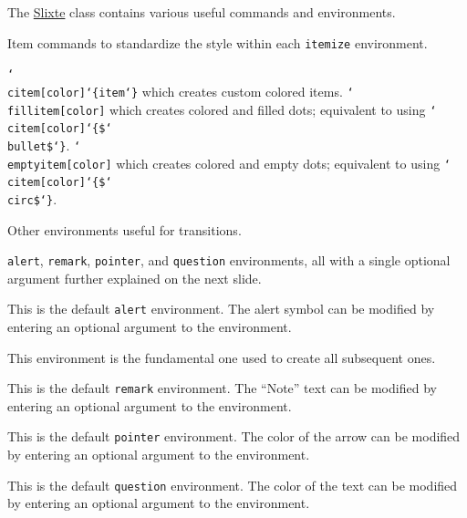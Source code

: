 \documentclass{slixte}
\def\clsurl{https://ctan.org/pkg/slixte}
\newcommand{\codetext}[1]{\texttt{\color{second}#1}}
\newcommand{\cmdt}[1]{\char`\\#1}
\newcommand{\cbrl}{\char`\{}
\newcommand{\cbrr}{\char`\}}
\newcommand{\cbrt}[1]{\cbrl#1\cbrr}
\newcommand{\slixte}{\href{\clsurl}{\color{first}Slixte}}
\begin{document}
\hypertarget{basic:list}{}
\begin{slide}
    The \slixte{} class contains various useful commands and environments.
    \begin{itemize}
        \fillitem Item commands to standardize the style within each \codetext{itemize} environment.
        \begin{itemize}
            \emptyitem \codetext{\cmdt{citem}[color]\cbrt{item}} which creates custom colored items.
            \emptyitem \codetext{\cmdt{fillitem}[color]} which creates colored and filled dots; equivalent to using \codetext{\cmdt{citem}[color]\cbrt{\$\cmdt{bullet}\$}}.
            \emptyitem \codetext{\cmdt{emptyitem}[color]} which creates colored and empty dots; equivalent to using \codetext{\cmdt{citem}[color]\cbrt{\$\cmdt{circ}\$}}.
        \end{itemize}
        \fillitem Other environments useful for transitions.
        \begin{itemize}
            \emptyitem \codetext{alert}, \codetext{remark}, \codetext{pointer}, and \codetext{question} environments, all with a single optional argument further explained on the next slide.
        \end{itemize}
    \end{itemize}
\end{slide}

\begin{slide}
    \begin{alert}
        This is the default \codetext{alert} environment.
        The alert symbol can be modified by entering an optional argument to the environment.
        
        This environment is the fundamental one used to create all subsequent ones.
    \end{alert}

    \spacing

    \begin{remark}
        This is the default \codetext{remark} environment.
        The ``Note'' text can be modified by entering an optional argument to the environment.
    \end{remark}

    \spacing

    \begin{pointer}
        This is the default \codetext{pointer} environment.
        The color of the arrow can be modified by entering an optional argument to the environment.
    \end{pointer}

    \spacing

    \begin{question}
        This is the default \codetext{question} environment.
        The color of the text can be modified by entering an optional argument to the environment.
    \end{question}
\end{slide}
\end{document}
